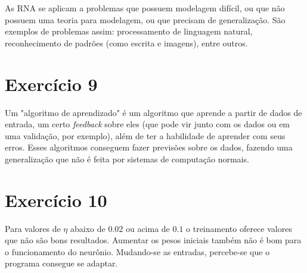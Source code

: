 \documentclass[a4]{article}
\begin{document}
As RNA se aplicam a problemas que possuem modelagem difícil, ou que não possuem uma teoria para modelagem, ou que precisam de generalização. São exemplos de problemas assim: processamento de linguagem natural, reconhecimento de padrões (como escrita e imagens), entre outros.

\section*{Exercício 9}

Um "algoritmo de aprendizado" é um algoritmo que aprende a partir de dados de entrada, um certo \textit{feedback} sobre eles (que pode vir junto com os dados ou em uma validação, por exemplo), além de ter a habilidade de aprender com seus erros. Esses algoritmos conseguem fazer previsões sobre os dados, fazendo uma generalização que não é feita por sistemas de computação normais.

\section*{Exercício 10}

Para valores de $ \eta $ abaixo de $ 0.02 $ ou acima de $ 0.1 $ o treinamento oferece valores que não são bons resultados. Aumentar os pesos iniciais também não é bom para o funcionamento do neurônio. Mudando-se as entradas, percebe-se que o programa consegue se adaptar.
\end{document}
